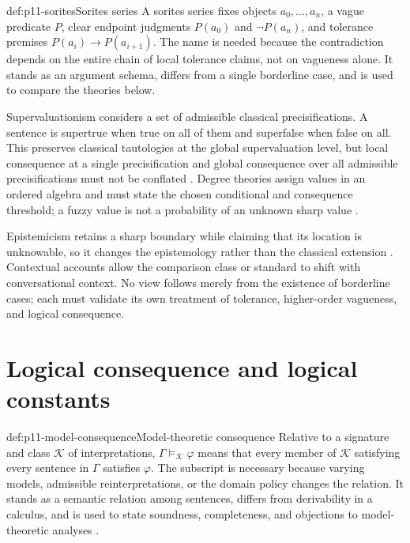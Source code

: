 \begin{hbdefinition}{def:p11-sorites}{Sorites series}
A sorites series fixes objects \(a_0,\ldots,a_n\), a vague predicate \(P\),
clear endpoint judgments \(P(a_0)\) and \(\neg P(a_n)\), and tolerance premises
\(P(a_i)\to P(a_{i+1})\). The name is needed because the contradiction depends
on the entire chain of local tolerance claims, not on vagueness alone. It
stands as an argument schema, differs from a single borderline case, and is
used to compare the theories below.
\end{hbdefinition}

Supervaluationism considers a set of admissible classical precisifications.
A sentence is supertrue when true on all of them and superfalse when false on
all. This preserves classical tautologies at the global supervaluation level,
but local consequence at a single precisification and global consequence over
all admissible precisifications must not be conflated \cite{Fine1975,
Keefe2000}. Degree theories assign values in an ordered algebra and must state
the chosen conditional and consequence threshold; a fuzzy value is not a
probability of an unknown sharp value \cite{Hajek1998,Smith2008}.

Epistemicism retains a sharp boundary while claiming that its location is
unknowable, so it changes the epistemology rather than the classical extension
\cite{Williamson1994}. Contextual accounts allow the comparison class or
standard to shift with conversational context. No view follows merely from
the existence of borderline cases; each must validate its own treatment of
tolerance, higher-order vagueness, and logical consequence.

\section{Logical consequence and logical constants}
\label{sec:p11-consequence}

\begin{hbdefinition}{def:p11-model-consequence}{Model-theoretic consequence}
Relative to a signature and class \(\mathcal K\) of interpretations,
\(\Gamma\models_{\mathcal K}\varphi\) means that every member of
\(\mathcal K\) satisfying every sentence in \(\Gamma\) satisfies \(\varphi\).
The subscript is necessary because varying models, admissible reinterpretations,
or the domain policy changes the relation. It stands as a semantic relation
among sentences, differs from derivability in a calculus, and is used to state
soundness, completeness, and objections to model-theoretic analyses
\cite{Tarski1983,Etchemendy1990}.
\end{hbdefinition}

